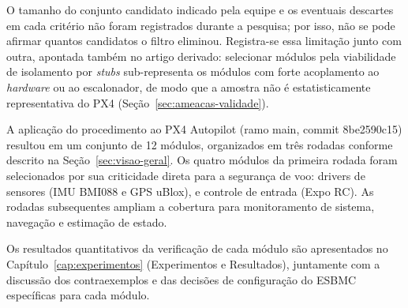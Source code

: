 O tamanho do conjunto candidato indicado pela equipe e os eventuais
descartes em cada critério não foram registrados durante a pesquisa; por isso,
não se pode afirmar quantos candidatos o filtro eliminou. Registra-se essa
limitação junto com outra, apontada também no artigo derivado: selecionar
módulos pela viabilidade de isolamento por \textit{stubs} sub-representa os
módulos com forte acoplamento ao \textit{hardware} ou ao escalonador, de modo
que a amostra não é estatisticamente representativa do PX4
(Seção~\ref{sec:ameacas-validade}).


A aplicação do procedimento ao PX4 Autopilot (ramo main, commit 8be2590c15) resultou em um conjunto de 12 módulos, organizados em três rodadas conforme descrito na Seção~\ref{sec:visao-geral}. Os quatro módulos da primeira rodada foram selecionados por sua criticidade direta para a segurança de voo: drivers de sensores (IMU BMI088 e GPS uBlox),  e controle de entrada (Expo RC). As rodadas subsequentes ampliam a cobertura para monitoramento de sistema, navegação e estimação de estado.

Os resultados quantitativos da verificação de cada módulo  são apresentados no Capítulo~\ref{cap:experimentos} (Experimentos e Resultados), juntamente com a discussão dos contraexemplos e das decisões de configuração do ESBMC específicas para cada módulo.

